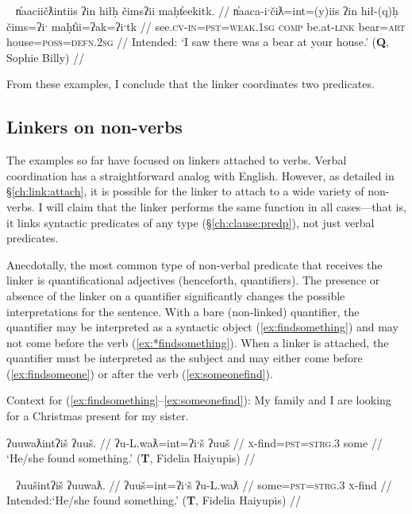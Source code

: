 \ex~ \label{*ex:sawabear}
\begingl
\glpreamble *n̓aaciičƛintiis ʔin hiłḥ čimsʔii maḥt̓eekitk. //
\gla n̓aaca-iˑčiƛ=int=(y)iis ʔin hił-(q)ḥ čims=ʔiˑ maḥt̓ii=ʔak=ʔiˑtk //
\glb see.\textsc{cv}-\textsc{in}=\textsc{pst}=\textsc{weak.1sg} \textsc{comp} be.at-\textsc{link} bear=\textsc{art} house=\textsc{poss}=\textsc{defn.2sg} //
\glft Intended: `I saw there was a bear at your house.' (\textbf{Q}, Sophie Billy) //
\endgl
\xe

From these examples, I conclude that the linker coordinates two predicates.

\subsection{Linkers on non-verbs} \label{ch:link:nonverb}

The examples so far have focused on linkers attached to verbs. Verbal coordination has a straightforward analog with English. However, as detailed in \S\ref{ch:link:attach}, it is possible for the linker to attach to a wide variety of non-verbs. I will claim that the linker performs the same function in all cases---that is, it links syntactic predicates of any type (\S\ref{ch:clause:predp}), not just verbal predicates.

Anecdotally, the most common type of non-verbal predicate that receives the linker is quantificational adjectives (henceforth, quantifiers). The presence or absence of the linker on a quantifier significantly changes the possible interpretations for the sentence. With a bare (non-linked) quantifier, the quantifier may be interpreted as a syntactic object (\ref{ex:findsomething}) and may not come before the verb (\ref{ex:*findsomething}). When a linker is attached, the quantifier must be interpreted as the subject and may either come before (\ref{ex:findsomeone}) or after the verb (\ref{ex:someonefind}).

\vspace{5pt}

\noindent Context for (\ref{ex:findsomething}--\ref{ex:someonefind}): My family and I are looking for a Christmas present for my sister.

\ex \label{ex:findsomething}
\begingl
\glpreamble ʔuuwaƛintʔiš ʔuuš. //
\gla ʔu-L.waƛ=int=ʔiˑš ʔuuš //
\glb \textsc{x}-find=\textsc{pst}=\textsc{strg.3} some //
\glft `He/she found something.' (\textbf{T}, Fidelia Haiyupis) //
\endgl
\xe

\ex~ \label{ex:*findsomething}
\begingl
\glpreamble *ʔuušintʔiš ʔuuwaƛ. //
\gla ʔuuš=int=ʔiˑš ʔu-L.waƛ //
\glb some=\textsc{pst}=\textsc{strg.3} \textsc{x}-find //
\glft Intended:`He/she found something.' (\textbf{T}, Fidelia Haiyupis) //
\endgl
\xe

